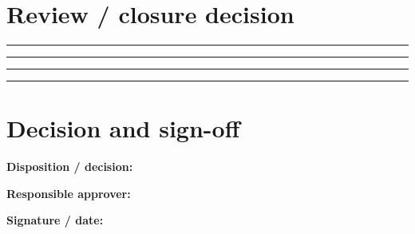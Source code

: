 \documentclass[10pt,letterpaper]{article}
\begin{document}
\section{Review / closure decision}
\noindent\rule{\linewidth}{0.4pt}\par\vspace{16pt}
\noindent\rule{\linewidth}{0.4pt}\par\vspace{16pt}
\noindent\rule{\linewidth}{0.4pt}\par\vspace{16pt}
\noindent\rule{\linewidth}{0.4pt}\par\vspace{16pt}
\section{Decision and sign-off}
\noindent\textbf{Disposition / decision:}\quad\hrulefill\par\vspace{11pt}
\noindent\textbf{Responsible approver:}\quad\hrulefill\par\vspace{11pt}
\noindent\textbf{Signature / date:}\quad\hrulefill\par\vspace{11pt}
\end{document}
